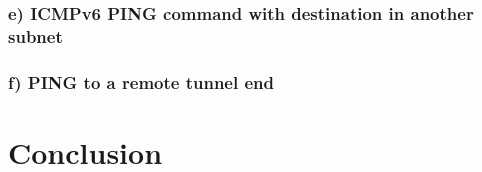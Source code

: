 \subsection{e) ICMPv6 PING command with destination in another subnet}
\subsection{f) PING to a remote tunnel end}

\chapter{Conclusion}
\label{conclusion}